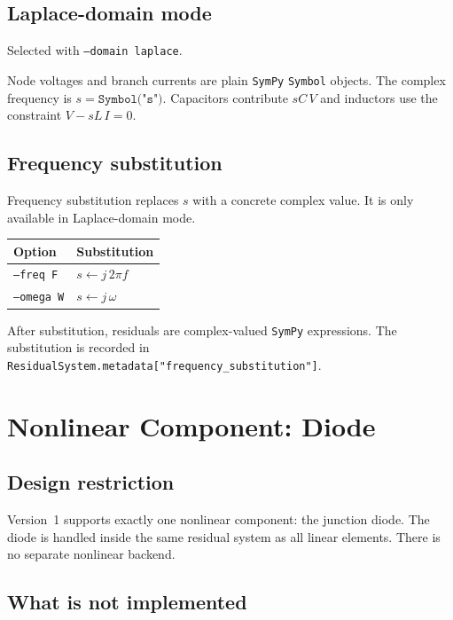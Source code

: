 \documentclass[11pt,a4paper]{article}
\newcommand{\code}[1]{\texttt{#1}}
\newcommand{\sympy}{\texttt{SymPy}}
\begin{document}
\subsection{Laplace-domain mode}

Selected with \code{--domain laplace}.

Node voltages and branch currents are plain \sympy{} \code{Symbol} objects.
The complex frequency is \(s = \texttt{Symbol("s")}\).
Capacitors contribute \(sC\,V\) and inductors use the constraint
\(V - sL\,I = 0\).

\subsection{Frequency substitution}

Frequency substitution replaces \(s\) with a concrete complex value.
It is only available in Laplace-domain mode.

\begin{center}
\begin{tabular}{ll}
\toprule
Option & Substitution \\
\midrule
\code{--freq F}   & \(s \leftarrow j\,2\pi f\) \\
\code{--omega W}  & \(s \leftarrow j\,\omega\) \\
\bottomrule
\end{tabular}
\end{center}

After substitution, residuals are complex-valued \sympy{} expressions.
The substitution is recorded in \code{ResidualSystem.metadata["frequency\_substitution"]}.

\section{Nonlinear Component: Diode}
\label{sec:diode}

\subsection{Design restriction}

Version~1 supports exactly one nonlinear component: the junction diode.
The diode is handled inside the same residual system as all linear elements.
There is no separate nonlinear backend.

\subsection{What is not implemented}
\end{document}
